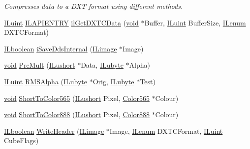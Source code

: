 \begin{DoxyCompactItemize}
\begin{DoxyCompactList}\small\item\em Compresses data to a D\-X\-T format using different methods. \end{DoxyCompactList}\item 
\hyperlink{il_8h_ac6508d0e9c19e32f32e00d54b5b8cf30}{I\-Luint} \hyperlink{il_8h_a69c08a8d06df986f7e46f209d131ef2f}{I\-L\-A\-P\-I\-E\-N\-T\-R\-Y} \hyperlink{il__dds-save_8c_a4ae3b92dd5e43a62dd44b3ee9d85087f}{il\-Get\-D\-X\-T\-C\-Data} (\hyperlink{il_8h_a5530e04d947bcddd83639ea7940faf10}{void} $\ast$Buffer, \hyperlink{il_8h_ac6508d0e9c19e32f32e00d54b5b8cf30}{I\-Luint} Buffer\-Size, \hyperlink{il_8h_a1542f3a70c0c5370a30a1fa5ce349e2d}{I\-Lenum} D\-X\-T\-C\-Format)
\item 
\hyperlink{il_8h_a8be80d75c2c636b9f2250fe10c2e7874}{I\-Lboolean} \hyperlink{il__dds-save_8c_ade47c3367f39f7ba62daf2383189f5f9}{i\-Save\-Dds\-Internal} (\hyperlink{struct_i_limage}{I\-Limage} $\ast$Image)
\item 
\hyperlink{il_8h_a5530e04d947bcddd83639ea7940faf10}{void} \hyperlink{il__dds-save_8c_ae2d46491134fc82da2fe1d8d3adfbbf0}{Pre\-Mult} (\hyperlink{il_8h_af6287b43748354a7c4864da43ae56962}{I\-Lushort} $\ast$Data, \hyperlink{il_8h_a8d2f04500100a86d1b00e98ab1b15a33}{I\-Lubyte} $\ast$Alpha)
\item 
\hyperlink{il_8h_ac6508d0e9c19e32f32e00d54b5b8cf30}{I\-Luint} \hyperlink{il__dds-save_8c_a785cd1442fa064d05542dcf8dd35c510}{R\-M\-S\-Alpha} (\hyperlink{il_8h_a8d2f04500100a86d1b00e98ab1b15a33}{I\-Lubyte} $\ast$Orig, \hyperlink{il_8h_a8d2f04500100a86d1b00e98ab1b15a33}{I\-Lubyte} $\ast$Test)
\item 
\hyperlink{il_8h_a5530e04d947bcddd83639ea7940faf10}{void} \hyperlink{il__dds-save_8c_ab6bc919f16b19a1db4b4fc82e6399cc2}{Short\-To\-Color565} (\hyperlink{il_8h_af6287b43748354a7c4864da43ae56962}{I\-Lushort} Pixel, \hyperlink{struct_color565}{Color565} $\ast$Colour)
\item 
\hyperlink{il_8h_a5530e04d947bcddd83639ea7940faf10}{void} \hyperlink{il__dds-save_8c_a3c30914d668ce52c8e47afe1d31af450}{Short\-To\-Color888} (\hyperlink{il_8h_af6287b43748354a7c4864da43ae56962}{I\-Lushort} Pixel, \hyperlink{struct_color888}{Color888} $\ast$Colour)
\item 
\hyperlink{il_8h_a8be80d75c2c636b9f2250fe10c2e7874}{I\-Lboolean} \hyperlink{il__dds-save_8c_aeaeb2db38540459fcf0d9373d86c9ca8}{Write\-Header} (\hyperlink{struct_i_limage}{I\-Limage} $\ast$Image, \hyperlink{il_8h_a1542f3a70c0c5370a30a1fa5ce349e2d}{I\-Lenum} D\-X\-T\-C\-Format, \hyperlink{il_8h_ac6508d0e9c19e32f32e00d54b5b8cf30}{I\-Luint} Cube\-Flags)
\end{DoxyCompactItemize}


